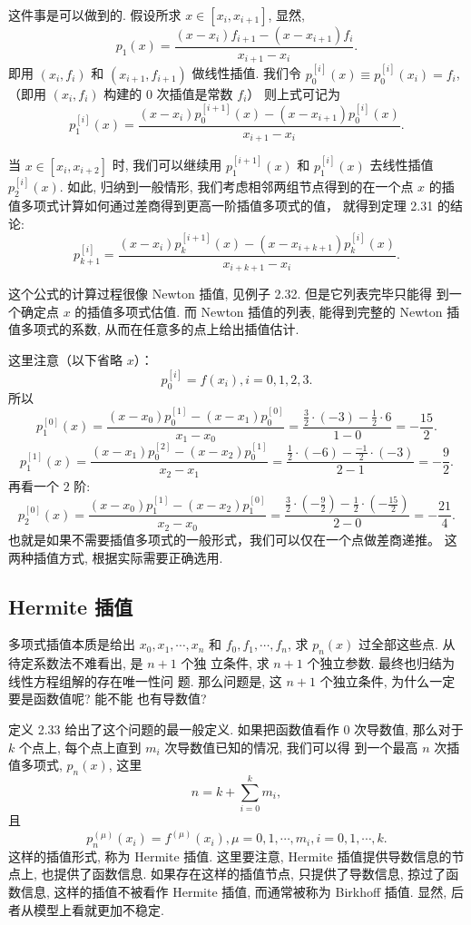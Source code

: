 \documentclass[a4paper]{ctexart}
\begin{document}
这件事是可以做到的. 假设所求 $x \in [x_i, x_{i + 1}]$, 显然,
$$
p_1(x) = \frac{(x - x_i)f_{i + 1} - (x - x_{i + 1})f_i}{x_{i + 1} - x_i}.
$$
即用 $(x_i, f_i)$ 和 $(x_{i + 1}, f_{i + 1})$ 做线性插值. 
我们令 $p_0^{[i]}(x) \equiv p_0^{[i]}(x_i) = f_i$, （即用 $(x_i, f_i)$ 构建的 
$0$ 次插值是常数 $f_i$）
则上式可记为
$$
p_1^{[i]}(x) = \frac{(x - x_i)p_0^{[i + 1]}(x) - (x - x_{i + 1})p_0^{[i]}(x)}{x_{i + 1} - x_i}.
$$

当 $x \in [x_i, x_{i + 2}]$ 时, 我们可以继续用 $p_1^{[i + 1]}(x)$ 和
$p_1^{[i]}(x)$ 去线性插值 $p_2^{[i]}(x)$. 如此, 归纳到一般情形, 
我们考虑相邻两组节点得到的在一个点 $x$ 的插值多项式计算如何通过差商得到更高一阶插值多项式的值，
就得到定理 2.31 的结论:
$$
p_{k + 1}^{[i]} = \frac{(x - x_i)p_k^{[i + 1]}(x) - (x - x_{i + k + 1})p_k^{[i]}(x)}{x_{i + k + 1} - x_i}.
$$

这个公式的计算过程很像 Newton 插值, 见例子 2.32. 但是它列表完毕只能得
到一个确定点 $x$ 的插值多项式估值. 而 Newton 插值的列表, 能得到完整的
Newton 插值多项式的系数, 从而在任意多的点上给出插值估计.

这里注意（以下省略 $x$）：
\[
p_0^{[i]} = f(x_i), i = 0, 1, 2, 3.
\]
所以
\[
p_1^{[0]}(x) = \frac{(x - x_0)p_0^{[1]} - (x - x_1)p_0^{[0]}}{x_1 - x_0}
= \frac{\frac{3}{2} \cdot (-3) - \frac{1}{2} \cdot 6}{1 - 0} = -\frac{15}{2}.
\]
\[
p_1^{[1]}(x) = \frac{(x - x_1)p_0^{[2]} - (x - x_2)p_0^{[1]}}{x_2 - x_1}
= \frac{\frac{1}{2} \cdot (-6) - \frac{-1}{2} \cdot (-3)}{2 - 1} = -\frac{9}{2}.
\]
再看一个 $2$ 阶:
\[
p_2^{[0]}(x) = \frac{(x - x_0)p_1^{[1]} - (x - x_2)p_1^{[0]}}{x_2 - x_0}
= \frac{\frac{3}{2} \cdot (-\frac{9}{2}) - \frac{1}{2} \cdot (-\frac{15}{2})}{2 - 0} 
= -\frac{21}{4}.
\]
也就是如果不需要插值多项式的一般形式，我们可以仅在一个点做差商递推。
这两种插值方式, 根据实际需要正确选用. 

\subsection{Hermite 插值}

多项式插值本质是给出 $x_0, x_1, \cdots, x_n$ 和 $f_0, f_1, \cdots,
f_n$, 求 $p_n(x)$ 过全部这些点. 从待定系数法不难看出, 是 $n + 1$ 个独
立条件, 求 $n + 1$ 个独立参数. 最终也归结为线性方程组解的存在唯一性问
题. 那么问题是, 这 $n + 1$ 个独立条件, 为什么一定要是函数值呢? 能不能
也有导数值?

定义 2.33 给出了这个问题的最一般定义. 如果把函数值看作 $0$ 次导数值,
那么对于 $k$ 个点上, 每个点上直到 $m_i$ 次导数值已知的情况, 我们可以得
到一个最高 $n$ 次插值多项式, $p_n(x)$, 这里
$$
n = k + \sum_{i = 0}^k m_i,
$$
且
$$
p_n^{(\mu)}(x_i) = f^{(\mu)}(x_i), \mu = 0, 1, \cdots, m_i, i = 0, 1, \cdots, k.
$$
这样的插值形式, 称为 Hermite 插值. 这里要注意, Hermite 插值提供导数信息的节点上, 
也提供了函数信息. 如果存在这样的插值节点, 只提供了导数信息, 掠过了函数信息, 
这样的插值不被看作 Hermite 插值, 而通常被称为 Birkhoff 插值. 显然, 后者从模型上看就更加不稳定.
\end{document}
